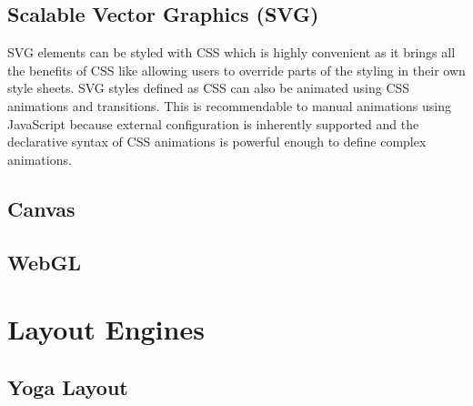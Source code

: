 

\subsection{Scalable Vector Graphics (SVG)}







SVG elements can be styled with CSS which is highly convenient as it brings all the benefits of CSS like allowing users to override parts of the styling in their own style sheets. SVG styles defined as CSS can also be animated using CSS animations and transitions. This is recommendable to manual animations using JavaScript because external configuration is inherently supported and the declarative syntax of CSS animations is powerful enough to define complex animations.




\subsection{Canvas}

\subsection{WebGL}

\section{Layout Engines}

\subsection{Yoga Layout}

